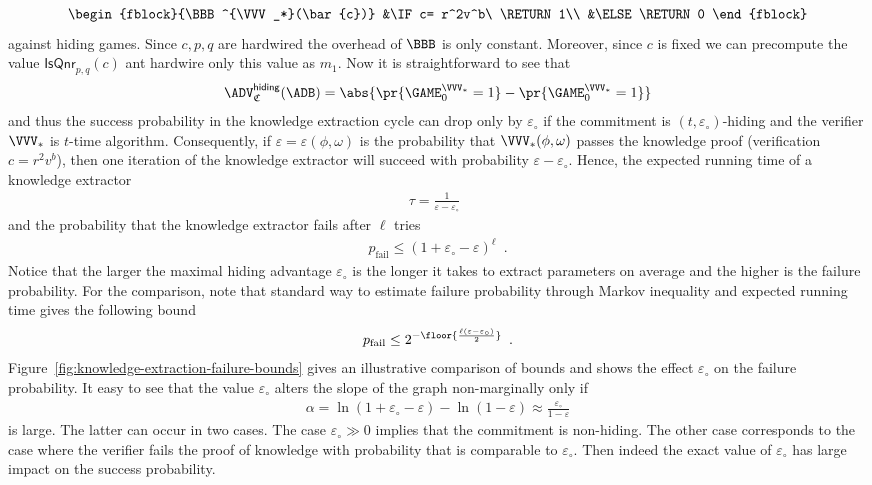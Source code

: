 \documentclass{crypto-exercise}
\newcommand{\ADVHIDING}[2]{\ADV^{\mathsf{hiding}}_{#1}(#2)}
\newcommand{\CS}{\mathfrak{C}}
\newcommand{\ISQNR}{\mathsf{IsQnr}}
\newcommand{\PFAIL}{p_{\mathrm{fail}}}
\begin{document}
\begin{solution}
\begin{align*}
\begin{fblock}{\BBB^{\VVV_*}(\bar{c})}
 &\IF c= r^2v^b\ \RETURN 1\\
 &\ELSE \RETURN 0
 \end{fblock}
\end{align*}  
against hiding games. Since $c,p,q$ are hardwired the overhead of $\BBB$ is only constant. Moreover, since $c$ is fixed we can precompute the value $\ISQNR_{p,q}(c)$ ant hardwire only this value as $m_1$. Now it is straightforward to see that 
\begin{align*}
\ADVHIDING{\CS}{\ADB}=\abs{\pr{\smash{\GAME_0^{\VVV_*}=1}}-\pr{\smash{\GAME_0^{\VVV_*}=1}}}
\end{align*}  
and thus the success probability in the knowledge extraction cycle can drop only by $\varepsilon_\circ$ if the commitment is $(t,\varepsilon_\circ)$-hiding and the verifier $\VVV_*$ is $t$-time algorithm. Consequently, if $\varepsilon=\varepsilon(\phi,\omega)$ is the probability that $\VVV_*(\phi,\omega)$ passes the knowledge proof (verification $c=r^2v^b$), then  one iteration of the knowledge extractor will succeed with probability $\varepsilon - \varepsilon_\circ$. Hence, the expected running time of a knowledge extractor
\begin{align*}
\tau=\frac{1}{\varepsilon - \varepsilon_\circ}\enspace
\end{align*}
and the probability that the knowledge extractor fails after $\ell$ tries
\begin{align*}
\PFAIL\leq(1+\varepsilon_\circ-\varepsilon)^\ell\enspace.
\end{align*} 
Notice that the larger the maximal hiding advantage $\varepsilon_\circ$ is the longer it takes to extract parameters on average and the higher is the failure probability. For the comparison, note that standard way to estimate failure probability through Markov inequality and expected running time gives the following bound
\begin{align*}
\PFAIL\leq 2^{-\floor{\frac{\ell(\varepsilon - \varepsilon_\circ)}{2}}}\enspace.
\end{align*}
Figure~\ref{fig:knowledge-extraction-failure-bounds} gives an illustrative comparison of bounds and shows the effect $\varepsilon_\circ$ on the failure probability. It easy to see that the value $\varepsilon_\circ$ alters the slope of the graph non-marginally only if
\begin{align*}
\alpha=\ln(1+\varepsilon_\circ-\varepsilon)-\ln(1-\varepsilon)\approx \frac{\varepsilon_\circ}{1-\varepsilon}
\end{align*}
is large. The latter can occur in two cases. The case $\varepsilon_\circ\gg 0$ implies that the commitment is non-hiding. The other case corresponds to the case where the verifier fails the proof of knowledge with probability that is comparable to $\varepsilon_\circ$. Then indeed the exact value of $\varepsilon_\circ$ has large impact on the success probability.  



\end{solution}
\end{document}
